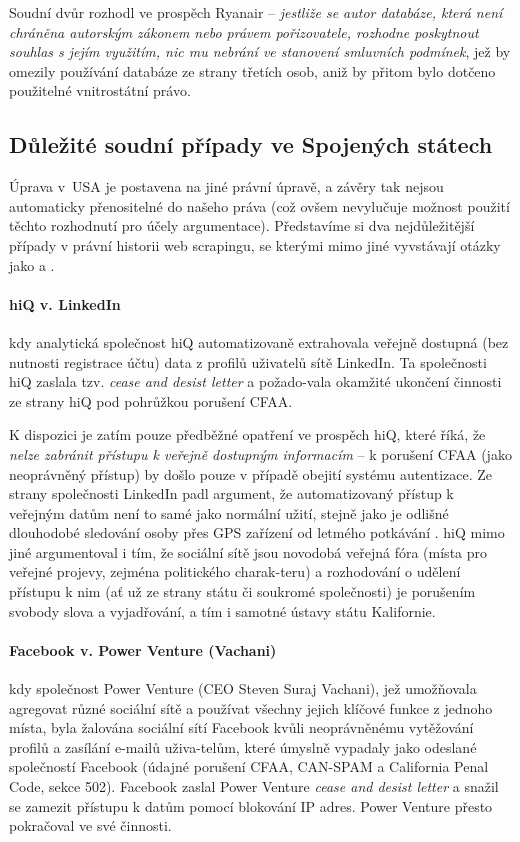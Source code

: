 \documentclass[thesis=B,czech]{FITthesis}[2012/06/26]
\begin{document}
Soudní dvůr rozhodl ve prospěch Ryanair -- \emph{jestliže se autor databáze, která není chráněna autorským zákonem nebo právem pořizovatele, rozhodne poskytnout souhlas s jejím využitím, nic mu nebrání ve stanovení smluvních podmínek}, jež by omezily používání databáze ze strany třetích osob, aniž by přitom bylo dotčeno použitelné vnitrostátní právo.\cite{C-30/14}

\subsection{Důležité soudní případy ve Spojených státech}
Úprava v USA je postavena na jiné právní úpravě, a závěry tak nejsou automaticky přenositelné do našeho práva (což ovšem nevylučuje možnost použití těchto rozhodnutí pro účely argumentace). Představíme si dva nejdůležitější případy v právní historii web scrapingu, se kterými mimo jiné vyvstávají otázky jako  a .

\paragraph{hiQ v. LinkedIn} kdy analytická společnost hiQ automatizovaně extrahovala veřejně dostupná (bez nutnosti registrace účtu) data z profilů uživatelů sítě LinkedIn. Ta společnosti hiQ zaslala tzv. \textit{cease and desist letter} a požado-vala okamžité ukončení činnosti ze strany hiQ pod pohrůžkou porušení CFAA.\cite{hiq_linkedin_1}

K dispozici je zatím pouze předběžné opatření ve prospěch hiQ, které říká, že \textit{nelze zabránit přístupu k veřejně dostupným informacím} -- k porušení CFAA (jako neoprávněný přístup) by došlo pouze v případě obejití systému autentizace. Ze strany společnosti LinkedIn padl argument, že automatizovaný přístup k veřejným datům není to samé jako normální  užití, stejně jako je odlišné dlouhodobé sledování osoby přes GPS zařízení od letmého potkávání \cite{linkedin_arg}. hiQ mimo jiné argumentoval i tím, že sociální sítě jsou novodobá veřejná fóra (místa pro veřejné projevy, zejména politického charak-teru\cite{public_forum}) a rozhodování o udělení přístupu k nim (ať už ze strany státu či soukromé společnosti) je porušením svobody slova a vyjadřování, a tím i samotné ústavy státu Kalifornie.\cite{hiq_linkedin_2}

\paragraph{Facebook v. Power Venture (Vachani)} kdy společnost Power Venture (CEO Steven Suraj Vachani), jež umožňovala agregovat různé sociální sítě a používat všechny jejich klíčové funkce z jednoho místa, byla žalována sociální sítí Facebook kvůli neoprávněnému vytěžování profilů a zasílání e-mailů uživa-telům, které úmyslně vypadaly jako odeslané společností Facebook (údajné porušení CFAA, CAN-SPAM a California Penal Code, sekce 502). Facebook zaslal Power Venture \textit{cease and desist letter} a snažil se zamezit přístupu k datům pomocí blokování IP adres. Power Venture přesto pokračoval ve své činnosti.\cite{facebook_venture_1}
\end{document}
